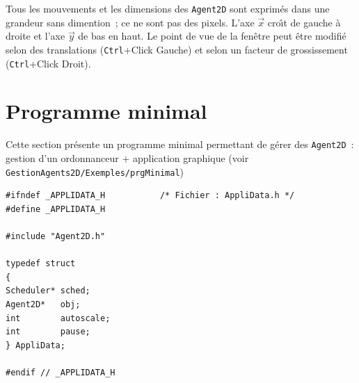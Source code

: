 \documentclass[12pt]{article}
\begin{document}
Tous les mouvements et les dimensions des \verb!Agent2D! sont exprim\'es
dans une grandeur sans dimention~; ce ne sont pas des pixels.
L'axe $\vec{x}$ cro{\^\i}t de gauche \`a droite et l'axe $\vec{y}$ de bas
en haut. Le point de vue de la fen\^etre peut \^etre modifi\'e selon des
translations (\verb!Ctrl!+Click Gauche) et selon un facteur de grossissement
(\verb!Ctrl!+Click Droit).

\vspace{-0.1cm}
\section{Programme minimal}

\vspace{-0.1cm}
Cette section pr\'esente un programme minimal permettant de
g\'erer des {\tt Agent2D}~: gestion d'un ordonnanceur + application
graphique (voir {\tt GestionAgents2D/Exemples/prgMinimal})

\vspace{-0.1cm}
\begin{small}
\begin{verbatim}
#ifndef _APPLIDATA_H           /* Fichier : AppliData.h */
#define _APPLIDATA_H

#include "Agent2D.h"

typedef struct
{
Scheduler* sched;
Agent2D*   obj;
int        autoscale;
int        pause;
} AppliData;

#endif // _APPLIDATA_H
\end{verbatim}
\end{small}
\end{document}

